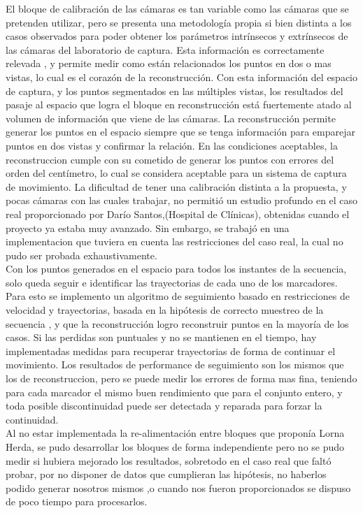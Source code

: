 El bloque de calibración de las cámaras es tan variable como las cámaras que se pretenden utilizar, pero se presenta una metodología propia si bien distinta a los casos observados para poder obtener los parámetros intrínsecos y extrínsecos de las cámaras del laboratorio de captura. Esta información es correctamente relevada , y permite medir como están relacionados los puntos en dos o mas vistas, lo cual es el corazón de la reconstrucción. Con esta información del espacio de captura, y los puntos segmentados en las múltiples vistas, los resultados del pasaje al espacio que logra el bloque en reconstrucción está  fuertemente atado al volumen de información que viene de las cámaras. La reconstrucción permite generar los puntos en el espacio siempre que se tenga información para emparejar puntos en dos vistas y confirmar  la relación. En las condiciones aceptables, la reconstruccion cumple con su cometido de generar los puntos con errores del orden del centímetro, lo cual se considera aceptable para un sistema de captura de movimiento. La dificultad de tener una calibración distinta a la propuesta, y pocas cámaras con las cuales trabajar, no permitió un estudio profundo en el caso real proporcionado por Darío Santos,(Hospital de Clínicas), obtenidas cuando el proyecto ya estaba muy avanzado. Sin embargo, se trabajó en una implementacion que tuviera en cuenta las restricciones del caso real, la cual no pudo ser probada exhaustivamente.
\\ 

Con los puntos generados en el espacio para todos los instantes de la secuencia, solo queda seguir e identificar las trayectorias de cada uno de los marcadores. Para esto se implemento un algoritmo de seguimiento basado en restricciones de velocidad y trayectorias, basada en la hipótesis de correcto muestreo de la secuencia , y que la reconstrucción logro reconstruir puntos en la mayoría de los casos. Si las perdidas son puntuales y no se mantienen en el tiempo, hay implementadas medidas para recuperar trayectorias de forma de continuar el movimiento. Los resultados de performance de seguimiento son los mismos que los de reconstruccion, pero se puede medir los errores de forma mas fina, teniendo para cada marcador el mismo buen rendimiento que para el conjunto entero, y toda posible discontinuidad puede ser detectada y reparada para forzar la continuidad. 
\\ 

Al no estar implementada la re-alimentación entre bloques que proponía Lorna Herda, se pudo desarrollar los bloques de forma independiente pero no se pudo medir si hubiera mejorado los resultados, sobretodo en el caso real que faltó probar, por no disponer de datos que cumplieran las hipótesis, no haberlos podido generar nosotros mismos ,o cuando nos fueron proporcionados se dispuso de poco tiempo para procesarlos.
\\

